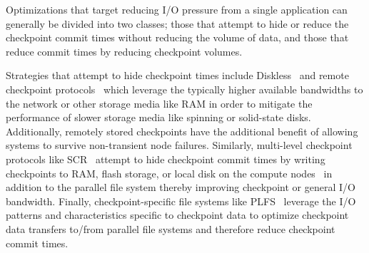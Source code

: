 Optimizations that target reducing I/O pressure from a single application can
generally be divided into two classes; those that attempt to hide or reduce the
checkpoint commit times without reducing the volume of data, and those that
reduce commit times by reducing checkpoint volumes. 

Strategies that attempt to hide checkpoint times include
Diskless~\cite{Plank98Diskless} and remote checkpoint
protocols~\cite{Cornwell11RemoteBLCR,Stellner96CoCheck,Zandy99ProcessHijacking}
which leverage the typically higher available bandwidths to the network or
other storage media like RAM in order to mitigate the performance of slower
storage media like spinning or solid-state disks. Additionally, remotely stored
checkpoints have the additional benefit of allowing systems to survive
non-transient node failures. Similarly, multi-level checkpoint protocols like
SCR~\cite{Moody10SCR,Vaidya95TwoLevel} attempt to hide checkpoint commit times
by writing checkpoints to RAM, flash storage, or local disk on the compute
nodes~\cite{Kougkas2017} in addition to the parallel file system thereby
improving checkpoint or general I/O bandwidth.  Finally, checkpoint-specific
file systems like PLFS~\cite{Bent09PLFS} leverage the I/O patterns and
characteristics specific to checkpoint data to optimize checkpoint data
transfers to/from parallel file systems and therefore reduce checkpoint commit
times.

